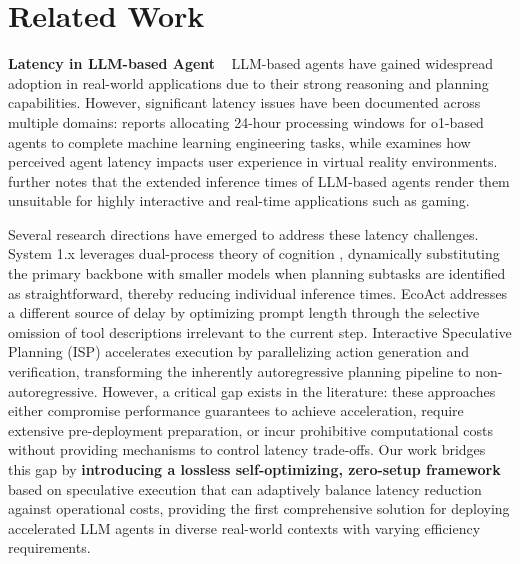 \section{Related Work}

\noindent \textbf{Latency in LLM-based Agent} ~ LLM-based agents have gained widespread adoption in real-world applications \citep{ge2024openagi, wu2023autogen} due to their strong reasoning and planning capabilities. However, significant latency issues have been documented across multiple domains: \cite{jaech2024openai} reports allocating 24-hour processing windows for o1-based agents to complete machine learning engineering tasks, while \cite{elfleet2024investigating} examines how perceived agent latency impacts user experience in virtual reality environments. \cite{liu2023llm} further notes that the extended inference times of LLM-based agents render them unsuitable for highly interactive and real-time applications such as gaming.

Several research directions have emerged to address these latency challenges. System 1.x \citep{saha2025system} leverages dual-process theory of cognition \citep{evans2003two, hua2022system}, dynamically substituting the primary backbone with smaller models when planning subtasks are identified as straightforward, thereby reducing individual inference times. EcoAct \citep{zhang2024ecoact} addresses a different source of delay by optimizing prompt length through the selective omission of tool descriptions irrelevant to the current step. Interactive Speculative Planning (ISP) \citep{hua2024interactive} accelerates execution by parallelizing action generation and verification, transforming the inherently autoregressive planning pipeline to non-autoregressive. However, a critical gap exists in the literature: these approaches either compromise performance guarantees to achieve acceleration, require extensive pre-deployment preparation, or incur prohibitive computational costs without providing mechanisms to control latency trade-offs. Our work bridges this gap by \textbf{introducing a lossless self-optimizing, zero-setup framework} based on speculative execution that can adaptively balance latency reduction against operational costs, providing the first comprehensive solution for deploying accelerated LLM agents in diverse real-world contexts with varying efficiency requirements.

